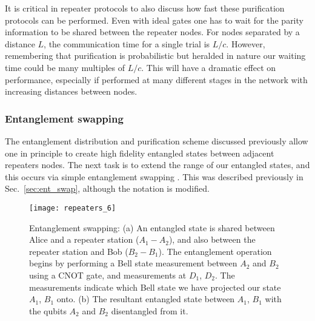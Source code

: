 It is critical in repeater protocols to also discuss how fast these purification protocols can be performed. Even with ideal gates one has to wait for the parity information to be shared between the repeater nodes. For nodes separated by a distance $L$, the communication time for a single trial is $L/c$. However, remembering that purification is probabilistic but heralded in nature our waiting time could be many multiples of $L/c$. This will have a dramatic effect on performance, especially if performed at many different stages in the network with increasing distances between nodes.

\subsubsection{Entanglement swapping}\label{sec:reps_ent_swap}

The entanglement distribution and purification scheme discussed previously allow one in principle to create high fidelity entangled states between adjacent repeaters nodes. The next task is to extend the range of our entangled states, and this occurs via simple entanglement swapping \cite{bib:BDCZ98, bib:Zukowski93, bib:goebel08, bib:duan01}. This was described previously in Sec.~\ref{sec:ent_swap}, although the notation is modified.

\begin{figure}[!htb]
\texttt{[image: repeaters\_6]}
\caption{Entanglement swapping: (a) An entangled state is shared between Alice and a repeater station ($A_1-A_2$), and also between the repeater station and Bob ($B_2-B_1$). The entanglement operation begins by performing a Bell state measurement between $A_2$ and $B_2$ using a CNOT gate, and measurements at $D_1$, $D_2$.  The measurements indicate which Bell state we have projected our state $A_1$, $B_1$ onto. (b) The resultant entangled state between $A_1$, $B_1$ with the qubits $A_2$ and $B_2$ disentangled from it.}
\label{fig:repeaters_6}
\end{figure} 

